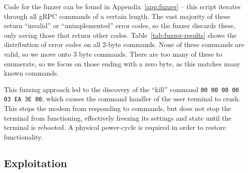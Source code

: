 Code for the fuzzer can be found in Appendix~\ref{app:fuzzer} -- this script iterates through all gRPC commands of a certain length.
The vast majority of these return ``invalid'' or ``unimplemented'' error codes, so the fuzzer discards these, only saving those that return other codes.
Table~\ref{tab:fuzzer-results} shows the distribution of error codes on all 2-byte commands.
None of these commands are valid, so we move onto 3 byte commands.
There are too many of these to enumerate, so we focus on those ending with a zero byte, as this matches many known commands.

This fuzzing approach led to the discovery of the ``kill'' command \lstinline{00 00 00 00 03 EA 3E 00}, which causes the command handler of the user terminal to crash.
This stops the modem from responding to commands, but does not stop the terminal from functioning, effectively freezing its settings and state until the terminal is rebooted.
A physical power-cycle is required in order to restore functionality.


\subsection{Exploitation}\label{sec:exploitation}

